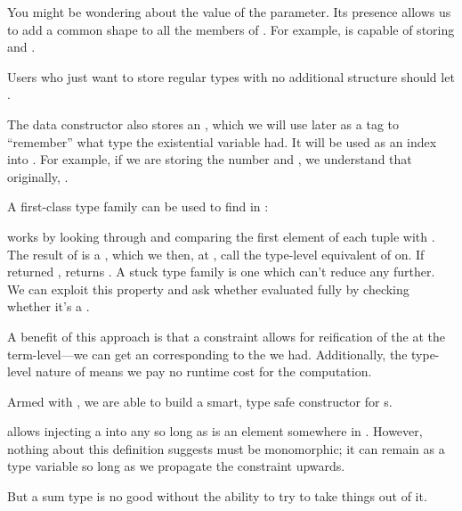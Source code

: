 \documentclass[book.tex]{subfiles}
\begin{document}
You might be wondering about the value of the  parameter. Its presence
allows us to add a common shape to all the members of . For example,
 is capable of storing 
and .

Users who just want to store regular types with no additional structure should
let .

The  data constructor also stores an , which we will use
later as a tag to ``remember'' what type the existential variable  had. It
will be used as an index into . For example, if we are storing the number
 and , we understand that originally, .

A first-class type family can be used to find  in :


 works by looking through  and comparing the first element
of each tuple with . The result of  is a ,
which we then, at , call the type-level equivalent of  on.
If  returned ,  returns . A
stuck type family is one which can't reduce any further. We can exploit this
property and ask whether  evaluated fully by checking whether it's
a .


A benefit of this approach is that a  constraint allows for
reification of the  at the term-level---we can get an 
corresponding to the  we had. Additionally, the type-level nature of
 means we pay no runtime cost for the computation.


Armed with , we are able to build a smart, type safe constructor
for s.


 allows injecting a  into any  so long as
 is an element somewhere in . However, nothing about this
definition suggests  must be monomorphic; it can remain as a type
variable so long as we propagate the  constraint upwards.

But a sum type is no good without the ability to try to take things out of it.
\end{document}
